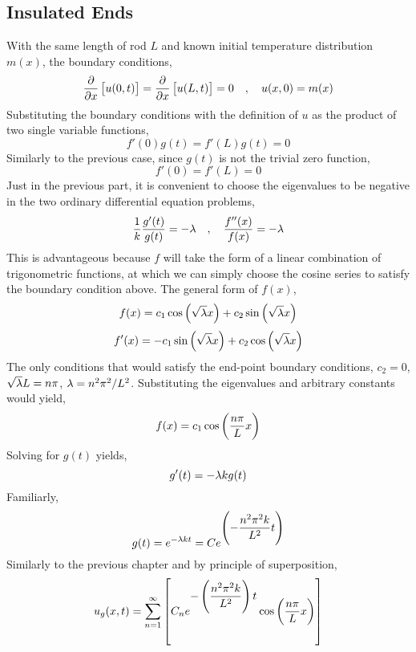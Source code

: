 \documentclass[class=report, 12pt, crop=false]{standalone}
\begin{document}
\begin{center}
\section{Insulated Ends}
\begin{comment} 
\end{comment}
With the same length of rod $L$ and known initial temperature distribution $m(x)$, the boundary conditions,
$$\frac{\partial}{\partial x}\left[u(0,t)\right] = \frac{\partial}{\partial x}\left[u(L,t)\right] = 0\quad,\quad u(x,0) = m(x)$$
Substituting the boundary conditions with the definition of $u$ as the product of two single variable functions,
$$f'(0)g(t) = f'(L)g(t) = 0$$
Similarly to the previous case, since $g(t)$ is not the trivial zero function,
$$f'(0) = f'(L) = 0$$
Just in the previous part, it is convenient to choose the eigenvalues to be negative in the two ordinary differential equation problems,
$$\frac{1}{k}\frac{g'(t)}{g(t)} = -\lambda \quad,\quad \frac{f''(x)}{f(x)} = -\lambda$$
This is advantageous because $f$ will take the form of a linear combination of trigonometric functions, at which we can simply choose the cosine series to satisfy the boundary condition above. The general form of $f(x)$,
$$f(x) = c_1\cos\left(\sqrt{\lambda}x\right) + c_2\sin\left(\sqrt{\lambda}x\right)$$
$$f'(x) = -c_1\sin\left(\sqrt{\lambda}x\right) + c_2\cos\left(\sqrt{\lambda}x\right)$$
The only conditions that would satisfy the end-point boundary conditions, $c_2 = 0$, $\sqrt{\lambda}L = n\pi$, $\lambda = n^2\pi^2/L^2$. Substituting the eigenvalues and arbitrary constants would yield,
$$f(x) = c_1\cos\left(\frac{n\pi}{L}x\right)$$
Solving for $g(t)$ yields,
$$g'(t) = -\lambda k g(t)$$
Familiarly,
$$g(t) =  e^{-\lambda k t} = Ce^{\displaystyle{\left(-\frac{n^2\pi^2k}{L^2} t\right)}}$$
Similarly to the previous chapter and by principle of superposition,
$$u_g(x,t) = \sum^{\infty}_{n=1}\left[C_ne^{\displaystyle{-\left(\frac{n^2\pi^2k}{L^2}\right)t}}\cos\left(\frac{n\pi}{L} x\right)\right]$$
\end{center}
\end{document}
